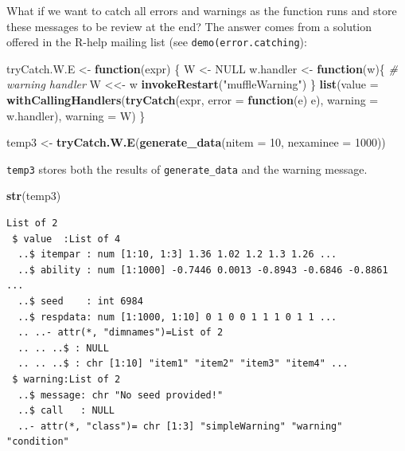 \documentclass[
]{book}
\newenvironment{Shaded}{\begin{snugshade}}{\end{snugshade}}
\newcommand{\CommentTok}[1]{\textcolor[rgb]{0.56,0.35,0.01}{\textit{#1}}}
\newcommand{\ControlFlowTok}[1]{\textcolor[rgb]{0.13,0.29,0.53}{\textbf{#1}}}
\newcommand{\DataTypeTok}[1]{\textcolor[rgb]{0.13,0.29,0.53}{#1}}
\newcommand{\DecValTok}[1]{\textcolor[rgb]{0.00,0.00,0.81}{#1}}
\newcommand{\KeywordTok}[1]{\textcolor[rgb]{0.13,0.29,0.53}{\textbf{#1}}}
\newcommand{\NormalTok}[1]{#1}
\newcommand{\OtherTok}[1]{\textcolor[rgb]{0.56,0.35,0.01}{#1}}
\newcommand{\StringTok}[1]{\textcolor[rgb]{0.31,0.60,0.02}{#1}}
\begin{document}
What if we want to catch all errors and warnings as the function runs and store these messages to be review at the end? The answer comes from a solution offered in the R-help mailing list (see \texttt{demo(error.catching}):

\begin{Shaded}
\begin{Highlighting}[]
\NormalTok{tryCatch.W.E <-}\StringTok{ }\ControlFlowTok{function}\NormalTok{(expr) \{}
\NormalTok{  W <-}\StringTok{ }\OtherTok{NULL}
\NormalTok{  w.handler <-}\StringTok{ }\ControlFlowTok{function}\NormalTok{(w)\{ }\CommentTok{# warning handler}
\NormalTok{    W <<-}\StringTok{ }\NormalTok{w}
    \KeywordTok{invokeRestart}\NormalTok{(}\StringTok{"muffleWarning"}\NormalTok{)}
\NormalTok{    \}}
  \KeywordTok{list}\NormalTok{(}\DataTypeTok{value =} \KeywordTok{withCallingHandlers}\NormalTok{(}\KeywordTok{tryCatch}\NormalTok{(expr, }\DataTypeTok{error =} \ControlFlowTok{function}\NormalTok{(e) e),}
                                   \DataTypeTok{warning =}\NormalTok{ w.handler), }\DataTypeTok{warning =}\NormalTok{ W)}
\NormalTok{\}}

\NormalTok{temp3 <-}\StringTok{ }\KeywordTok{tryCatch.W.E}\NormalTok{(}\KeywordTok{generate_data}\NormalTok{(}\DataTypeTok{nitem =} \DecValTok{10}\NormalTok{, }\DataTypeTok{nexaminee =} \DecValTok{1000}\NormalTok{))}
\end{Highlighting}
\end{Shaded}

\texttt{temp3} stores both the results of \texttt{generate\_data} and the warning message.

\begin{Shaded}
\begin{Highlighting}[]
\KeywordTok{str}\NormalTok{(temp3)}
\end{Highlighting}
\end{Shaded}

\begin{verbatim}
List of 2
 $ value  :List of 4
  ..$ itempar : num [1:10, 1:3] 1.36 1.02 1.2 1.3 1.26 ...
  ..$ ability : num [1:1000] -0.7446 0.0013 -0.8943 -0.6846 -0.8861 ...
  ..$ seed    : int 6984
  ..$ respdata: num [1:1000, 1:10] 0 1 0 0 1 1 1 0 1 1 ...
  .. ..- attr(*, "dimnames")=List of 2
  .. .. ..$ : NULL
  .. .. ..$ : chr [1:10] "item1" "item2" "item3" "item4" ...
 $ warning:List of 2
  ..$ message: chr "No seed provided!"
  ..$ call   : NULL
  ..- attr(*, "class")= chr [1:3] "simpleWarning" "warning" "condition"
\end{verbatim}
\end{document}

